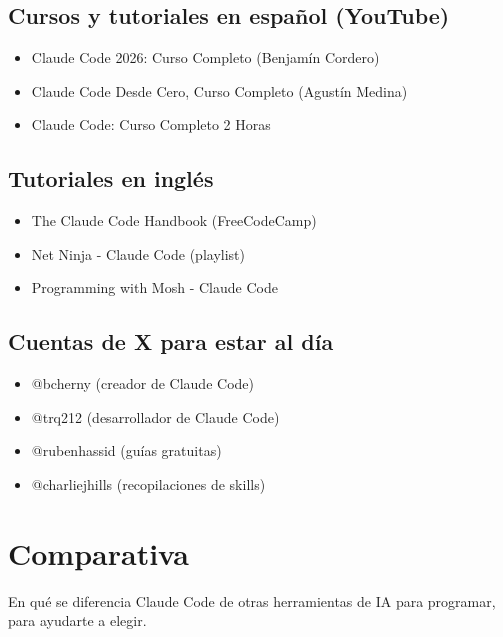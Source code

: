\documentclass[11pt,a4paper]{book}
\begin{document}
\section{Cursos y tutoriales en español (YouTube)}
\begin{itemize}\item Claude Code 2026: Curso Completo (Benjamín Cordero)\end{itemize}
\begin{itemize}\item Claude Code Desde Cero, Curso Completo (Agustín Medina)\end{itemize}
\begin{itemize}\item Claude Code: Curso Completo 2 Horas\end{itemize}
\section{Tutoriales en inglés}
\begin{itemize}\item The Claude Code Handbook (FreeCodeCamp)\end{itemize}
\begin{itemize}\item Net Ninja - Claude Code (playlist)\end{itemize}
\begin{itemize}\item Programming with Mosh - Claude Code\end{itemize}
\section{Cuentas de X para estar al día}
\begin{itemize}\item @bcherny (creador de Claude Code)\end{itemize}
\begin{itemize}\item @trq212 (desarrollador de Claude Code)\end{itemize}
\begin{itemize}\item @rubenhassid (guías gratuitas)\end{itemize}
\begin{itemize}\item @charliejhills (recopilaciones de skills)\end{itemize}
\chapter{Comparativa}
En qué se diferencia Claude Code de otras herramientas de IA para programar, para ayudarte a elegir.
\end{document}
